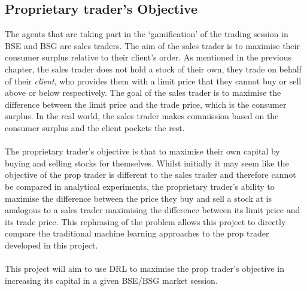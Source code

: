 \documentclass[ %
                    author={Ashwinder Khurana},
                supervisor={Prof Dave Cliff},
                    degree={MEng},
                     title={The Deeply Reinforced Trader},
                  subtitle={},
                      type={enterprise},
                      year={2020} ]{dissertation}
\begin{document}
\subsection{Proprietary trader's Objective}
\vspace{0.5cm}
The agents that are taking part in the \enquote*{gamification} of the trading session in BSE and BSG are sales traders. The aim of the sales trader is to maximise their consumer surplus relative to their client's order. As mentioned in the previous chapter, the sales trader does not hold a stock of their own, they trade on behalf of their \textit{client}, who provides them with a limit price that they cannot buy or sell above or below respectively. The goal of the sales trader is to maximise the difference between the limit price and the trade price, which is the consumer surplus. In the real world, the sales trader makes commission based on the consumer surplus and the client pockets the rest. 
\\
\\
The proprietary trader's objective is that to maximise their own capital by buying and selling stocks for themselves. Whilst initially it may seem like the objective of the prop trader is different to the sales trader and therefore cannot be compared in analytical experiments, the proprietary trader's ability to maximise the difference between the price they buy and sell a stock at is analogous to a sales trader maximising the difference between its limit price and its trade price. This rephrasing of the problem allows this project to directly compare the traditional machine learning approaches to the prop trader developed in this project.
\\
\\
This project will aim to use DRL to maximise the prop trader's objective in increasing its capital in a given BSE/BSG market session. 
\end{document}
